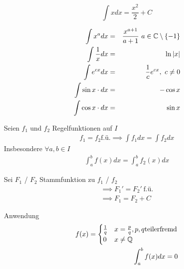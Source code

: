 \begin{Bsp}
  \[\int xdx = \frac{x^2}{2} + C\]
\end{Bsp}
\begin{Eig}
  \begin{align*}
    \int x^adx &=&  \frac{x^{a+1}}{a+1}\ a\in \mathbb{C}\setminus \{-1\}\\
    \int \frac{1}{x}dx &=&  \ln\left| x \right|\\
    \int e^{cx} dx &=&  \frac{1}{c}e^{cx},\ c\neq 0\\
    \int \sin x \cdot dx &=& -\cos x\\
    \int \cos x \cdot dx &=& \sin x
  \end{align*}
\end{Eig}
\begin{Sat}
  Seien $f_1$ und $f_2$ Regelfunktionen auf $I$
  \begin{align*}
    f_1=f_2 \text{f.ü.} \implies \int f_1 dx=\int f_2 dx
  \end{align*}
  Insbesondere $\forall a,b \in I$
  \begin{align*}
    \int^b_af(x)dx = \int^b_a f_2(x)dx
  \end{align*}
\end{Sat}
\begin{Bew}
  Sei $F_1$ / $F_2$ Stammfunktion zu $f_1$ / $f_2$
  \begin{align*}
    \implies F_1'=F_2'\ \text{f.ü.}\\
    \implies F_1=F_2+C
  \end{align*}
\end{Bew}
\begin{Bem}{Anwendung}
  \begin{align*}
    f(x)=\begin{cases}
      \frac{1}{q} & x=\frac{p}{q}, p,q \text{teilerfremd}\\
      0 & x\neq \mathbb{Q}
    \end{cases}\\
    \int^b_a f(x)dx =0
  \end{align*}
\end{Bem}

